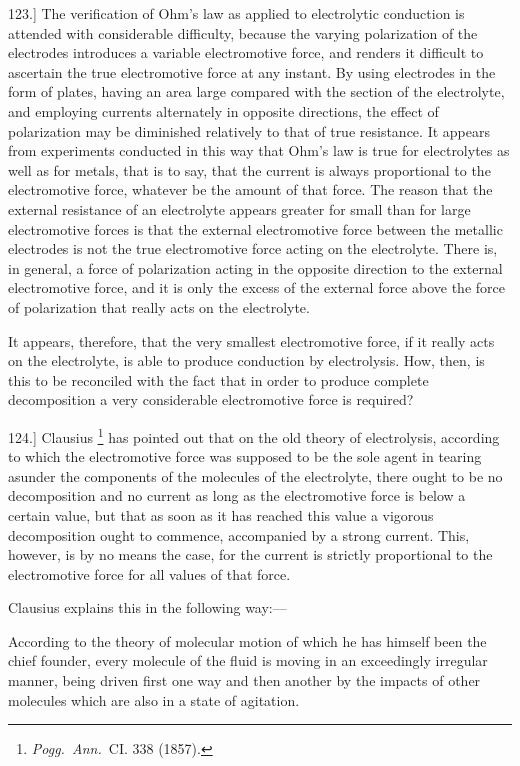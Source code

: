 \documentclass[12pt,oneside]{book}[2021/10/04]
\let\oldfootnote\footnote
\renewcommand\footnote[1]{%
\oldfootnote{\hspace{0.14em}#1}}
\newcommand{\Runhead}[1]{\fancyhead[C]{\iffloatpage{}{\small#1}}}
\newcommand{\article}[1]{\phantomsection \label{art:#1}{#1.]}}
\newcommand{\¬}{\hphantom{0}}
\begin{document}
\article{123} The verification of Ohm's law as applied to electrolytic
conduction is attended with considerable difficulty, because the
varying polarization of the electrodes introduces a variable electromotive
force, and renders it difficult to ascertain the true electromotive
force at any instant. By using electrodes in the form of
plates, having an area large compared with the section of the
electrolyte, and employing currents alternately in opposite directions,
the effect of polarization may be diminished relatively to
that of true resistance. \label{art:123a}It appears from experiments conducted
in this way that Ohm's law is true for electrolytes as well as
for metals, that is to say, that the current is always proportional
to the electromotive force, whatever be the amount of that force.
The reason that the external resistance of an electrolyte appears
greater for small than for large electromotive forces is that the
external electromotive force between the metallic electrodes is not
the true electromotive force acting on the electrolyte. There is,
in general, a force of polarization acting in the opposite direction
to the external electromotive force, and it is only the excess of
the external force above the force of polarization that really acts on
the electrolyte.

It appears, therefore, that the very smallest electromotive force,
if it really acts on the electrolyte, is able to produce conduction by
electrolysis. How, then, is this to be reconciled with the fact that
in order to produce complete decomposition a very considerable
electromotive force is required?

\article{124} Clausius\footnote{\textit{Pogg.\ Ann.}\ CI. 338 (1857).}
has pointed out that on the old theory of
electrolysis, according to which the electromotive force was supposed
to be the sole agent in tearing asunder the components
of the molecules of the electrolyte, there ought to be no decomposition
and no current as long as the electromotive force is
below a certain value, but that as soon as it has reached this
value a vigorous decomposition ought to commence, accompanied
by a strong current. This, however, is by no means the case,
for the current is strictly proportional to the electromotive force for
all values of that force.
\Runhead{ELECTROLYSIS.}

Clausius explains this in the following way:---

According to the theory of molecular motion of which he has
himself been the chief founder, every molecule of the fluid is
moving in an exceedingly irregular manner, being driven first
one way and then another by the impacts of other molecules which
are also in a state of agitation.
\end{document}
